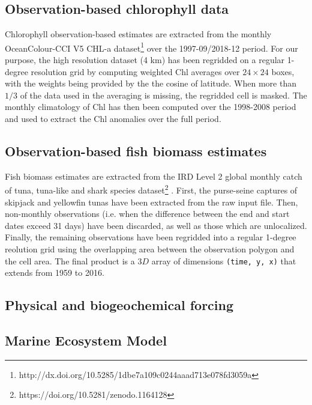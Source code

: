 \subsection{Observation-based chlorophyll data}

Chlorophyll observation-based estimates are extracted from the monthly OceanColour-CCI V5 CHL-a dataset\footnote{http://dx.doi.org/10.5285/1dbe7a109c0244aaad713e078fd3059a}  \citep{sathyendranathOceanColourTimeSeries2019} over the 1997-09/2018-12 period. For our purpose, the high resolution dataset (4 km) has been regridded on a regular 1-degree resolution grid by computing weighted Chl averages over $24\times24$ boxes, with the weights being provided by the the cosine of latitude. When more than $1/3$ of the data used in the averaging is missing, the regridded cell is masked. The monthly climatology of Chl has then been computed over the 1998-2008 period and used to extract the Chl anomalies over the full period.

\subsection{Observation-based fish biomass estimates}

Fish biomass estimates are extracted from the IRD Level 2 global monthly catch of tuna, tuna-like and shark species dataset\footnote{https://doi.org/10.5281/zenodo.1164128} \citep{taconetGlobalMonthlyCatch2018}. First, the purse-seine captures of skipjack and yellowfin tunas have been extracted from the raw input file. Then, non-monthly observations (i.e. when the difference between the end and start dates exceed 31 days) have been discarded, as well as those which are unlocalized. Finally, the remaining observations have been regridded into a regular 1-degree reolution grid using the overlapping area between the observation polygon and the cell area. The final product is a $3D$ array of dimensions \verb+(time, y, x)+ that extends from 1959 to 2016.

\subsection{Physical and biogeochemical forcing}


\subsection{Marine Ecosystem Model}
